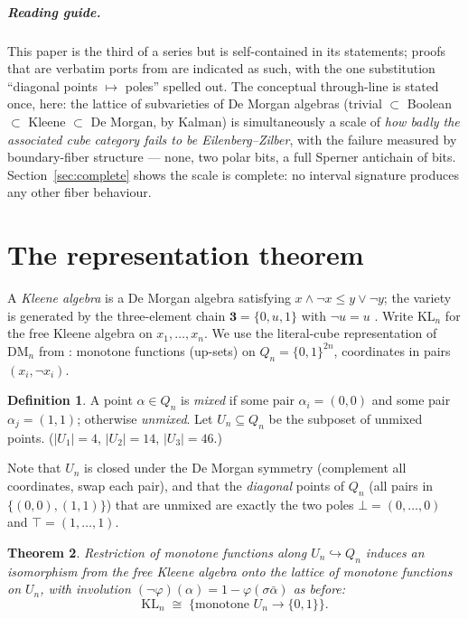 \documentclass[11pt]{amsart}
\newtheorem{thm}{Theorem}[section]
\theoremstyle{definition}
\newtheorem{defi}[thm]{Definition}
\newcommand{\DM}{\mathrm{DM}}
\newcommand{\KL}{\mathrm{KL}}
\newcommand{\lc}{Q}
\newcommand{\uc}{U}
\newcommand{\Kthree}{\mathbf{3}}
\begin{document}
\subparagraph*{Reading guide.}  This paper is the third of a
series but is self-contained in its statements; proofs that are
verbatim ports from \cite{DMFibers,StrictDM} are indicated as such,
with the one substitution ``diagonal points $\mapsto$ poles''
spelled out.  The conceptual through-line is stated once, here: the
lattice of subvarieties of De Morgan algebras (trivial $\subset$
Boolean $\subset$ Kleene $\subset$ De Morgan, by Kalman) is
simultaneously a scale of \emph{how badly the associated cube
category fails to be Eilenberg--Zilber}, with the failure measured
by boundary-fiber structure --- none, two polar bits, a full
Sperner antichain of bits.  Section~\ref{sec:complete} shows the
scale is complete: no interval signature produces any other fiber
behaviour.

\section{The representation theorem}
\label{sec:rep}

A \emph{Kleene algebra} is a De Morgan algebra satisfying
$x \wedge \neg x \leq y \vee \neg y$; the variety is generated by
the three-element chain $\Kthree = \{0, u, 1\}$ with $\neg u = u$
\cite{Kalman, GWW}.  Write $\KL_n$ for the free Kleene algebra on
$x_1, \dots, x_n$.  We use the literal-cube representation of
$\DM_n$ from \cite{DMFibers}: monotone functions (up-sets) on
$\lc_n = \{0,1\}^{2n}$, coordinates in pairs $(x_i, \neg x_i)$.

\begin{defi}
  A point $\alpha \in \lc_n$ is \emph{mixed} if some pair
  $\alpha_i = (0,0)$ and some pair $\alpha_j = (1,1)$; otherwise
  \emph{unmixed}.  Let $\uc_n \subseteq \lc_n$ be the subposet of
  unmixed points.  ($|\uc_1| = 4$, $|\uc_2| = 14$,
  $|\uc_3| = 46$.)
\end{defi}

Note that $\uc_n$ is closed under the De Morgan symmetry
(complement all coordinates, swap each pair), and that the
\emph{diagonal} points of $\lc_n$ (all pairs in
$\{(0,0), (1,1)\}$) that are unmixed are exactly the two poles
$\bot = (0,\dots,0)$ and $\top = (1,\dots,1)$.

\begin{thm}
  \label{thm:rep}
  Restriction of monotone functions along
  $\uc_n \hookrightarrow \lc_n$ induces an isomorphism from the
  free Kleene algebra onto the lattice of monotone functions on
  $\uc_n$, with involution
  $(\neg\varphi)(\alpha) = 1 - \varphi(\sigma\bar\alpha)$ as
  before:
  \[
    \KL_n \;\cong\; \{\text{monotone } \uc_n \to \{0,1\}\}.
  \]
\end{thm}
\end{document}
